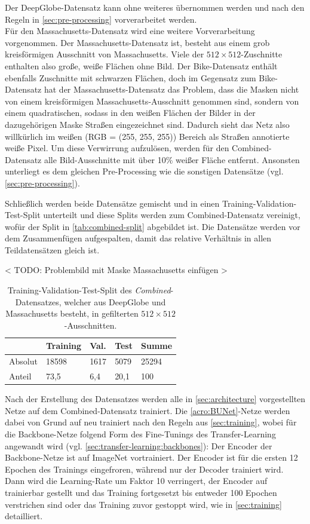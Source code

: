 Der DeepGlobe-Datensatz kann ohne weiteres übernommen werden und nach den Regeln in \autoref{sec:pre-processing} vorverarbeitet werden. \\ 
Für den Massachusetts-Datensatz wird eine weitere Vorverarbeitung vorgenommen. Der Massachusetts-Datensatz ist, 
besteht aus einem grob kreisförmigen Ausschnitt von Massachusetts. Viele der $512 \times 512$-Zuschnitte enthalten 
also große, weiße Flächen ohne Bild. Der Bike-Datensatz enthält ebenfalls Zuschnitte mit schwarzen Flächen, 
doch im Gegensatz zum Bike-Datensatz hat der Massachusetts-Datensatz das Problem, dass die Masken nicht von einem 
kreisförmigen Massachusetts-Ausschnitt genommen sind, sondern von einem quadratischen, sodass in den weißen Flächen 
der Bilder in der dazugehörigen Maske Straßen eingezeichnet sind. Dadurch sieht das Netz also willkürlich 
im weißen (RGB = (255, 255, 255)) Bereich als Straßen annotierte weiße Pixel. Um diese Verwirrung aufzulösen, werden 
für den Combined-Datensatz alle Bild-Ausschnitte mit über 10\% weißer Fläche entfernt. 
Ansonsten unterliegt es dem gleichen Pre-Processing wie die sonstigen Datensätze (vgl. \autoref{sec:pre-processing}). 

Schließlich werden beide Datensätze gemischt und in einen Training-Validation-Test-Split unterteilt und diese Splits werden zum 
Combined-Datensatz vereinigt, wofür der Split in \autoref{tab:combined-split} abgebildet ist. 
Die Datensätze werden vor dem Zusammenfügen aufgespalten, damit das relative Verhältnis in allen Teildatensätzen gleich ist.  

< TODO: Problembild mit Maske Massachusetts einfügen > 

\begin{table}[ht]
	\centering
	\begin{tabular}{l|l|l|l|l}
		& Training & Val. & Test & Summe \\
		\midrule
		Absolut & 18598 & 1617 & 5079 & 25294 \\
		Anteil & 73,5 & 6,4 & 20,1 & 100 \\ 
	\end{tabular}
	\caption{Training-Validation-Test-Split des \textit{Combined}-Datensatzes, welcher aus DeepGlobe und Massachusetts besteht, 
	in gefilterten $512 \times 512$-Ausschnitten.}
	\label{tab:combined-split}
\end{table}

Nach der Erstellung des Datensatzes werden alle in \autoref{sec:architecture} vorgestellten Netze
auf dem Combined-Datensatz trainiert. 
Die \autoref{acro:BUNet}-Netze werden dabei von Grund auf neu trainiert nach den Regeln aus \autoref{sec:training}, 
wobei für die Backbone-Netze folgend Form des Fine-Tunings des Transfer-Learning angewandt wird (vgl. \autoref{sec:transfer-learning:backbones}): 
Der Encoder der Backbone-Netze ist auf ImageNet vortrainiert. Der Encoder ist für die ersten 12 Epochen des Trainings eingefroren, 
während nur der Decoder trainiert wird. Dann  wird die Learning-Rate um Faktor 10 verringert, der Encoder 
auf trainierbar gestellt und das Training fortgesetzt bis entweder 100 Epochen verstrichen sind oder das Training 
zuvor gestoppt wird, wie in \autoref{sec:training} detailliert.    

